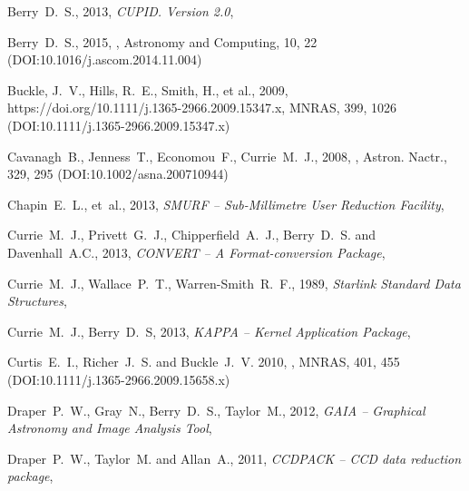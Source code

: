 \documentclass[11pt,oneside,chapters]{starlink}
\begin{document}
\begin{thebibliography}{}

Berry~D.~S., 2013, \textit{CUPID. Version 2.0}, 

Berry~D.~S., 2015, , Astronomy and Computing,
10, 22 (DOI:10.1016/j.ascom.2014.11.004)

Buckle, J.~V., Hills, R.~E., Smith, H., et al., 2009, 
{https://doi.org/10.1111/j.1365-2966.2009.15347.x}, MNRAS, 399, 1026
(DOI:10.1111/j.1365-2966.2009.15347.x)

Cavanagh~B., Jenness~T., Economou~F., Currie~M.~J., 2008,
,
Astron. Nactr., 329, 295 (DOI:10.1002/asna.200710944)

Chapin~E.~L., et~al., 2013, \textit{SMURF -- Sub-Millimetre User Reduction
Facility}, 

Currie~M.~J., Privett~G.~J., Chipperfield~A.~J., Berry~D.~S. and Davenhall~A.C., 2013,
\textit{CONVERT -- A Format-conversion Package}, 

Currie~M.~J., Wallace~P.~T., Warren-Smith~R.~F., 1989,
\textit{Starlink Standard Data Structures}, 

Currie~M.~J., Berry~D.~S, 2013, \textit{KAPPA -- Kernel Application Package},

Curtis~E.~I., Richer~J.~S. and Buckle~J.~V. 2010, ,
MNRAS, 401, 455 (DOI:10.1111/j.1365-2966.2009.15658.x)

Draper~P.~W., Gray~N., Berry~D.~S., Taylor~M., 2012,
\textit{GAIA -- Graphical Astronomy and Image Analysis Tool},

Draper~P.~W., Taylor~M. and Allan~A., 2011, \textit{CCDPACK -- CCD data reduction package},


\end{thebibliography}
\end{document}
